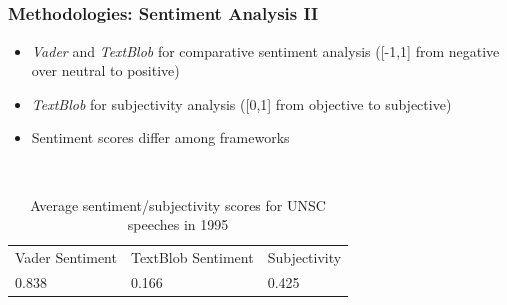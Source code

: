 \documentclass{beamer}
\begin{document}
\subsection{}
\begin{framefont}{\footnotesize}
	\begin{frame}
		\frametitle{Methodologies: Sentiment Analysis II}
		
		\begin{itemize}
			\setlength\itemsep{1.2em}
			\item \textit{Vader} and \textit{TextBlob} for comparative sentiment analysis ([-1,1] from negative over neutral to positive)
			\item \textit{TextBlob} for subjectivity analysis ([0,1] from objective to subjective)
			\item Sentiment scores differ among frameworks

		\end{itemize}
		\\[10]
				\begin{table}[]
        \begin{tabular}{|l|l|l|}
        \hline
        Vader Sentiment & TextBlob Sentiment & Subjectivity \\ \hhline{|=|=|=|}
        0.838                & 0.166                   & 0.425             \\ \hline
        
        \end{tabular}
        \\[3] %
  \caption{Average sentiment/subjectivity scores for UNSC speeches in 1995}
  \\[3]
        \end{table}
	\end{frame}
\end{framefont}
\end{document}
